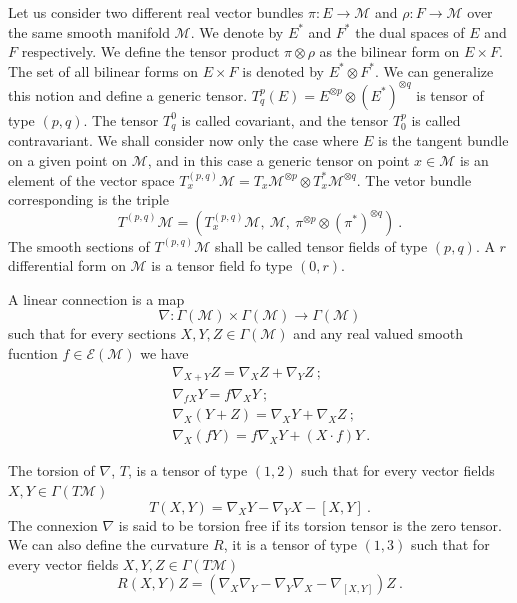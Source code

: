 \documentclass[10pt]{book}
\newcommand{\Ecal}{\mathcal{E}}
\newcommand{\Mcal}{\mathcal{M}}
\theoremstyle{break}
\begin{document}
\bigskip


Let us consider two different real vector bundles $\pi : E \to \Mcal$ and $\rho : F \to \Mcal$ over the same smooth manifold $\Mcal$. We denote by $E^\ast$ and $F^\ast$ the dual spaces of $E$ and $F$ respectively. We define the tensor product $\pi \otimes \rho$ as the bilinear form on $E \times F$. The set of all bilinear forms on $E \times F$ is denoted by $E^\ast \otimes F^\ast$.  We can generalize this notion and define a generic tensor. $T^p_q (E) = E^{\otimes p} \otimes (E^\ast)^{\otimes q}$ is tensor of type $(p,q)$. The tensor $T^0_q$ is called covariant, and the tensor $T^p_0$ is called contravariant. We shall consider now only the case where $E$ is the tangent bundle on a given point on $\Mcal$, and in this case a generic tensor on point $x \in \Mcal$ is an element of the vector space $T_x^{(p,q)} \Mcal = T_x\Mcal^{\otimes p} \otimes T_x^\ast\Mcal^{\otimes q}$. The vetor bundle corresponding is the triple
%
\begin{equation*}
T^{(p,q)} \Mcal = \left( T_x^{(p,q)} \Mcal , \ \Mcal , \ \pi^{\otimes p} \otimes (\pi^\ast)^{\otimes q} \right) \ .
\end{equation*}
%
The smooth sections of $T^{(p,q)} \Mcal$ shall be called tensor fields of type $(p,q)$. A $r$ differential form on $\Mcal$ is a tensor field fo type $(0,r)$. 


\bigskip


A linear connection is a map 
%
\begin{equation*}
\nabla : \Gamma(\Mcal) \times \Gamma(\Mcal) \to \Gamma(\Mcal)  
\end{equation*}
%
such that for every sections $X, Y, Z \in \Gamma(\Mcal)$ and any real valued smooth fucntion $f \in \Ecal(\Mcal)$ we have
%
\begin{eqnarray*}
&& \nabla_{X + Y} Z = \nabla_X Z + \nabla_Y Z \ ; \\ 
&& \nabla_{f X} Y = f \nabla_X Y \ ;\\
&& \nabla_X(Y+Z) = \nabla_X Y + \nabla_X Z \ ;\\
&& \nabla_X(fY) = f \nabla_X Y + (X \cdot f) Y \ .
\end{eqnarray*}

The torsion of $\nabla$, $T$, is a tensor of type $(1,2)$ such that for every vector fields $X, Y \in \Gamma(T\Mcal)$ 
%
\begin{equation*}
T(X,Y) = \nabla_X Y - \nabla_Y X - \left[ X,Y\right] \ .
\end{equation*}
%
The connexion $\nabla$ is said to be torsion free if its torsion tensor is the zero tensor. We can also define the curvature $R$, it is a tensor of type $(1,3)$ such that for every vector fields $X, Y, Z \in \Gamma(T\Mcal)$ 
%
\begin{equation*}
R(X,Y)Z = \left( \nabla_X \nabla_Y - \nabla_Y \nabla_X - \nabla_{[X,Y]} \right) Z \ .
\end{equation*}
\end{document}
